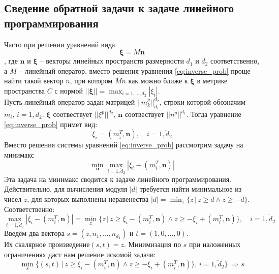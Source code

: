 \documentclass[a4paper,14pt]{article}
\theoremstyle{plain}
\theoremstyle{definition}
\theoremstyle{remark}
\newcommand{\nl}{\\ \indent}
\begin{document}
\subsection{Сведение обратной задачи к задаче линейного программирования}
Часто при решении уравнений вида
\begin{equation}
\pmb\xi = M \pmb n
\label{eq:inverse_prob}
\end{equation}
, где $\pmb n$ и $\pmb\xi$ -- векторы линейных 
пространств размерности $d_1$ и $d_2$ соответственно, 
а $M$ -- линейный оператор, вместо решения уравнения
\eqref{eq:inverse_prob} проще найти такой вектор $n$, 
при котором $Mn$ как можно ближе к $\pmb\xi $ в метрике
пространства $C$ с нормой
$||\pmb \xi|| = \max_{i=1, \ldots, d_2} |\xi_i|$.
\nl
Пусть линейный оператор задан матрицей $||m^p_k||^{d_2}_{d_1}$, 
строки которой обозначим 
$m_i, \, i = \overline{1, d_2}$. $\pmb \xi$ соотвествует
$||\xi^p||^{d_2}$, $\pmb n$ соотвествует $||n^p||^{d_1}$.
Тогда уравнение \eqref{eq:inverse_prob} примет вид:
\begin{equation}
\xi_i = (m_i^T, \pmb n), 
\quad i = \overline{1, d_2}
\end{equation}
Вместо решения системы уравнений \eqref{eq:inverse_prob}
рассмотрим задачу на минимакс
\begin{equation}
\min_{\pmb n}\max_{i=\overline{1, d_2}} 
|\xi_i - (m_i^T, \pmb n)|
\end{equation}
Эта задача на минимакс сводится к задаче линейного
программирования. 
\nl
Действительно, для вычисления модуля $|d|$
требуется найти минимальное из чисел $z$, для которых 
выполнены неравенества $|d| = \min_{z} \{ z \, | \, z 
\geq d \wedge z \geq -d\}$.
\nl
Соответственно:
\begin{equation}
\max_{i=\overline{1, d_2}} |\xi_i - (m_i^T, \pmb n)| = 
\min_{z} \{z \,| \, z \geq \xi_i - (m_i^T, \pmb n) 
\wedge z \geq -\xi_i + (m_i^T, \pmb n)\}
, \quad i = \overline{1, d_2}
\end{equation}
Введём два вектора 
$s = (z, n_1, \ldots, n_{d_1})$ и $t = (1, 0, \ldots, 0)$. \\
Их скалярное произведение$(s, t) = z$.
Минимизация по $s$ при наложенных ограничениях даст нам
решение искомой задачи:
\begin{equation}
\min_s \{(s, t) \, | \,  z \geq \xi_i - (m_i^T, \pmb n) 
\wedge z \geq -\xi_i + (m_i^T, \pmb n)\}
, \, i = \overline{1, d_2} \}\, \Longrightarrow \, s
\label{eq:minimize}
\end{equation}
\end{document}
